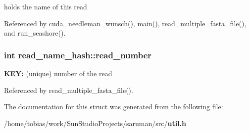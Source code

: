 holds the name of this read 

Referenced by cuda\_\-needleman\_\-wunsch(), main(), read\_\-multiple\_\-fasta\_\-file(), and run\_\-seashore().
\subsubsection[{read\_\-number}]{\setlength{\rightskip}{0pt plus 5cm}int {\bf read\_\-name\_\-hash::read\_\-number}}\label{structread__name__hash_b7c28c171cc440ed3649bfcdc14e9064}


{\bf KEY:} (unique) number of the read 

Referenced by read\_\-multiple\_\-fasta\_\-file().

The documentation for this struct was generated from the following file:\begin{CompactItemize}
\item 
/home/tobias/work/SunStudioProjects/saruman/src/{\bf util.h}\end{CompactItemize}
